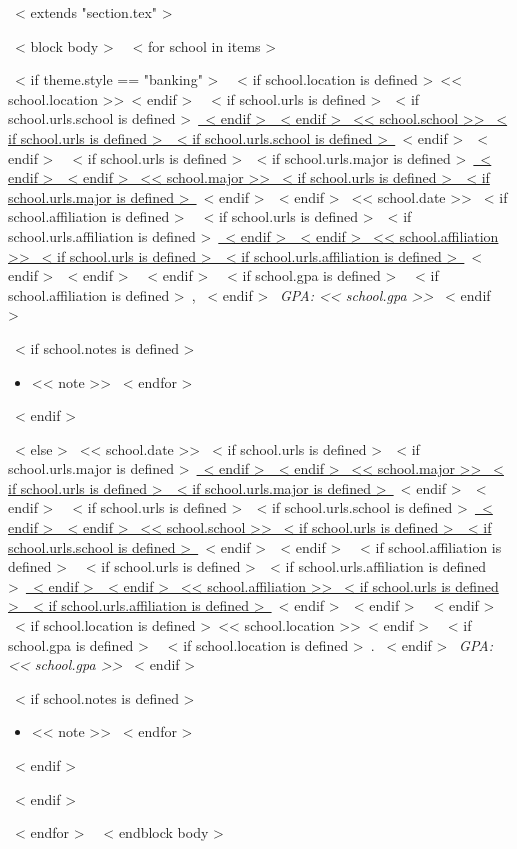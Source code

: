 ~< extends "section.tex" >~

~< block body >~
  ~< for school in items >~
    \begin{samepage}
      \cventry
        ~< if theme.style == "banking" >~
          {~< if school.location is defined >~<< school.location >>~< endif >~}
          {~< if school.urls is defined >~~< if school.urls.school is defined >~\href{school.urls.school}{~< endif >~~< endif >~%
             << school.school >>%
           ~< if school.urls is defined >~~< if school.urls.school is defined >~}~< endif >~~< endif >~}
          {~< if school.urls is defined >~~< if school.urls.major is defined >~\href{school.urls.major}{~< endif >~~< endif >~%
             << school.major >>%
           ~< if school.urls is defined >~~< if school.urls.major is defined >~}~< endif >~~< endif >~}
          {<< school.date >>}
          {~< if school.affiliation is defined >~%
             ~< if school.urls is defined >~~< if school.urls.affiliation is defined >~\href{school.urls.affiliation}{~< endif >~~< endif >~%
               << school.affiliation >>%
             ~< if school.urls is defined >~~< if school.urls.affiliation is defined >~}~< endif >~~< endif >~%
           ~< endif >~%
           ~< if school.gpa is defined >~%
             ~< if school.affiliation is defined >~, ~< endif >~%
             \textit{GPA: << school.gpa >>}%
           ~< endif >~
          }
          {~< if school.notes is defined >~\begin{itemize}
             ~< for note in school.notes >~
               \item{<< note >>}
             ~< endfor >~
           \end{itemize}~< endif >~}
        ~< else >~
          {<< school.date >>}
          {~< if school.urls is defined >~~< if school.urls.major is defined >~\href{school.urls.major}{~< endif >~~< endif >~%
             << school.major >>%
           ~< if school.urls is defined >~~< if school.urls.major is defined >~}~< endif >~~< endif >~}
          {~< if school.urls is defined >~~< if school.urls.school is defined >~\href{school.urls.school}{~< endif >~~< endif >~%
             << school.school >>%
           ~< if school.urls is defined >~~< if school.urls.school is defined >~}~< endif >~~< endif >~}
          {~< if school.affiliation is defined >~%
             ~< if school.urls is defined >~~< if school.urls.affiliation is defined >~\href{school.urls.affiliation}{~< endif >~~< endif >~%
               << school.affiliation >>%
             ~< if school.urls is defined >~~< if school.urls.affiliation is defined >~}~< endif >~~< endif >~%
           ~< endif >~}
          {~< if school.location is defined >~<< school.location >>~< endif >~%
           ~< if school.gpa is defined >~%
             ~< if school.location is defined >~. ~< endif >~%
             \textit{GPA: << school.gpa >>}%
           ~< endif >~}
          {~< if school.notes is defined >~\begin{itemize}
             ~< for note in school.notes >~
               \item{<< note >>}
             ~< endfor >~
           \end{itemize}~< endif >~}
        ~< endif >~
    \end{samepage}
  ~< endfor >~
~< endblock body >~
